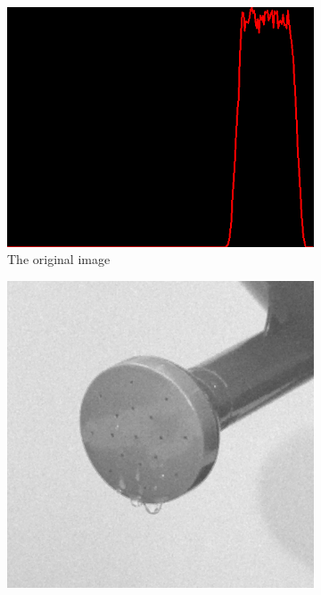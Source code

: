 \begin{figure}[H]
\begin{subfigure}[b]{0.24\textwidth}
        \includegraphics[width=\textwidth]{img3/hist_rect_src_img3.png}
        \caption{The original image}
        \label{fig:rect_org_img3}
    \end{subfigure}
    \begin{subfigure}[b]{0.24\textwidth}
        \includegraphics[width=\textwidth]{img3/rect_3_midpoint_3_final_img3_add.png}
        \begin{center}

\end{center}
\end{subfigure}
\end{figure}
